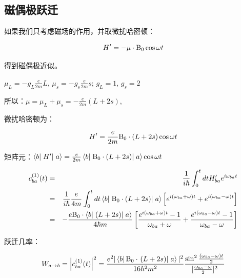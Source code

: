 \subsection{磁偶极跃迁}

如果我们只考虑磁场的作用，并取微扰哈密顿：

\begin{equation}\label{25-20}
H' =  - \mu  \cdot {\rm B}_0 \cos \omega t
\end{equation}

得到磁偶极近似。

$\mu _L  =  - g_L \frac{e}{{2m}}L$, $\mu _s  =  - g_s \frac{e}{{2m}}s$; $g_L  = 1$, $g_s  = 2$

所以：$\mu  = \mu _L  + \mu _s  =  - \frac{e}{{2m}}\left( {L + 2s} \right)$,

微扰哈密顿为：

\begin{equation}\label{25-21}
H' = \frac{e}{{2m}}{\rm B}_0  \cdot \left( {L + 2s} \right)\cos \omega t
\end{equation}

矩阵元：$\left\langle b \right|\left. {H'} \right|\left. a \right\rangle  = \frac{e}{{2m}}\left\langle b \right|\left. {{\rm B}_0  \cdot \left( {L + 2s} \right)} \right|\left. a \right\rangle \cos \omega t$

\begin{eqnarray*}
c_{ba}^{(1)} (t) & = & \frac{1}{{i\hbar }}\int_0^t {dtH'_{ba} e^{i\omega _{ba} t} } \\
{} & = &  \frac{1}{{i\hbar }}\frac{e}{{4m}}\int_0^t {dt\left\langle b \right|\left. {{\rm B}_0  \cdot \left( {L + 2s} \right)} \right|\left. a \right\rangle \left[ {e^{i(\omega _{ba}  + \omega )t}  + e^{i(\omega _{ba}  - \omega )t} } \right]}  \\
{} & = &  - \frac{{e{\rm B}_0  \cdot \left\langle b \right|\left. {\left( {L + 2s} \right)} \right|\left. a \right\rangle }}{{4\hbar m}}\left[ {\frac{{e^{i(\omega _{ba}  + \omega )t}  - 1}}{{\omega _{ba}  + \omega }} + \frac{{e^{i(\omega _{ba}  - \omega )t}  - 1}}{{\omega _{ba}  - \omega }}} \right] 
\end{eqnarray*}

跃迁几率：

\begin{equation}\label{25-22}
W_{a \to b}  = \left| {c_{ba}^{(1)} (t)} \right|^2  = \frac{{e^2 |
\left\langle b \right|{\rm B}_0  \cdot \left. {\left( {L + 2s}
\right)} \right|\left. a \right\rangle |^2 }}{{16\hbar ^2 m^2
}}\frac{{\sin ^2 {\textstyle{{(\omega _{ba}  - \omega )t} \over
2}}}}{{[{\textstyle{{\omega _{ba}  - \omega } \over 2}}]^2 }}
\end{equation}


